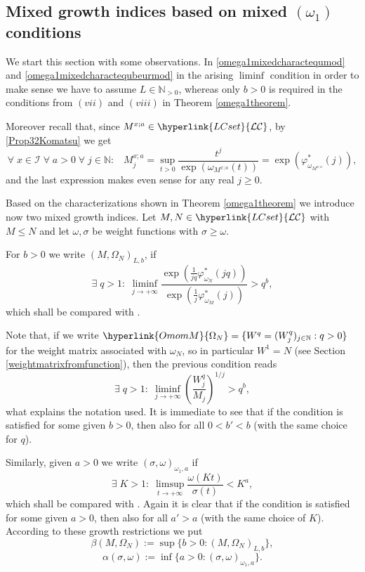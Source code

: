 \documentclass[10pt]{amsart}%
\numberwithin{equation}{section}
\theoremstyle{plain}
\newcommand{\NN}{\mathbb{N}}
\begin{document}
\subsection{Mixed growth indices based on mixed $(\omega_1)$ conditions}\label{mixedomega1indexsection}
We start this section with some observations. In \eqref{omega1mixedcharactequmod} and \eqref{omega1mixedcharactequbeurmod} in the arising $\liminf$ condition in order to make sense we have to assume $L\in\NN_{>0}$, whereas only $b>0$ is required in the conditions from $(vii)$ and $(viii)$ in Theorem \ref{omega1theorem}.

Moreover recall that, since $M^{x;a}\in\hyperlink{LCset}{\mathcal{LC}}$, by \eqref{Prop32Komatsu} we get
$$\forall\;x\in\mathcal{I}\;\forall\;a>0\;\forall\;j\in\NN:\;\;\;M^{x;a}_j=\sup_{t>0}\frac{t^j}{\exp(\omega_{M^{x;a}}(t))}=\exp(\varphi^{*}_{\omega_{M^{x;a}}}(j)),$$
and the last expression makes even sense for any real $j\ge 0$.\vspace{6pt}



Based on the characterizations shown in Theorem \ref{omega1theorem} we introduce now two mixed growth indices. Let $M,N\in\hyperlink{LCset}{\mathcal{LC}}$ with $M\le N$ and let $\omega,\sigma$ be weight functions with $\sigma\ge\omega$.

For $b>0$ we write $(M,\Omega_N)_{L,b}$, if
\begin{equation}\label{om1a}
\exists\;q>1:\;\liminf_{j\rightarrow+\infty}\frac{\exp(\frac{1}{jq}\varphi^{*}_{\omega_{N}}(jq))}{\exp(\frac{1}{j}\varphi^{*}_{\omega_{M}}(j))}>q^b,
\end{equation}
which shall be compared with \cite[Thm. 3.11 $(v)$]{index}.

Note that, if we write $\hyperlink{OmomM}{\Omega_N}=\{W^q=(W_j^q)_{j\in\NN}: q>0\}$ for the weight matrix associated with $\omega_N$, so in particular $W^1=N$ (see Section \ref{weightmatrixfromfunction}), then the previous condition reads
$$
\exists\;q>1:\;\liminf_{j\rightarrow+\infty}\left(\frac{W_j^q}{M_j}\right)^{1/j}>q^b,
$$
what explains the notation used. It is immediate to see that if the condition is satisfied for some given $b>0$, then also for all $0<b'<b$ (with the same choice for $q$).

Similarly, given $a>0$ we write $(\sigma,\omega)_{\omega_1,a}$ if
\begin{equation*}%
\exists\;K>1:\;\limsup_{t\rightarrow+\infty}\frac{\omega(Kt)}{\sigma(t)}<K^{a},
\end{equation*}
which shall be compared with \cite[Thm. 2.11 $(iv)$]{index}. Again it is clear that if the condition is satisfied for some given $a>0$, then also for all $a'>a$ (with the same choice of $K$). According to these growth restrictions we put
\begin{equation}\label{om1a2}
\beta(M,\Omega_N):=\sup\{b>0: (M,\Omega_N)_{L,b}\},
\end{equation}
\begin{equation}\label{om1a3}
\alpha(\sigma,\omega):=\inf\{a>0: (\sigma,\omega)_{\omega_1,a}\}.
\end{equation}
\end{document}
